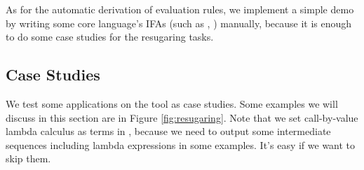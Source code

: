 As for the automatic derivation of evaluation rules, we implement a simple demo by writing some core language's IFAs (such as , ) manually, because it is enough to do some case studies for the resugaring tasks.

\subsection{Case Studies}



We test some applications on the tool as case studies. Some examples we will discuss in this section are in Figure \ref{fig:resugaring}. Note that we set call-by-value lambda calculus as terms in , because we need to output some intermediate sequences including lambda expressions in some examples. It's easy if we want to skip them. 

